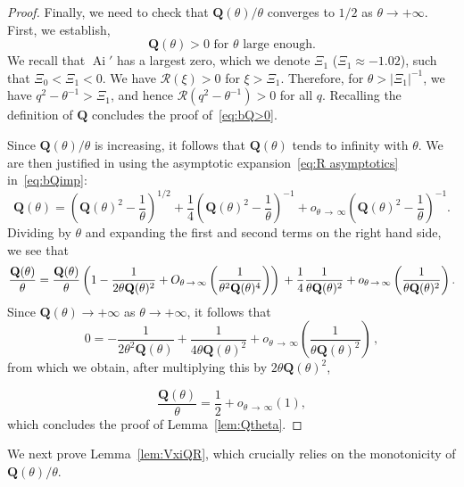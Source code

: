 \documentclass[10pt]{amsart}
\theoremstyle{definition}\newtheorem{defi}[theo]{Definition}\newtheorem{rema}[theo]{Remark}\newtheorem{exam}[theo]{Example}\newtheorem{exem}[theo]{Example}\newtheorem{nota}[theo]{Notation}
\DeclareMathOperator{\Ai}{Ai}
\newcommand{\bQ}{\mathbf{Q}}
\newcommand{\mR}{\mathcal{R}}
\newcommand{\1}{\mathds{1}}
\begin{document}
\begin{proof}
Finally, we need to check that $\bQ(\theta)/\theta$ converges to $1/2$ as $\theta\to +\infty$. First, we establish,
\begin{equation}\label{eq:bQ>0}
\bQ(\theta) > 0 \text{ for $\theta$ large enough.}
\end{equation}
We recall that $\Ai'$ has a largest zero, which we denote $\Xi_1$ ($\Xi_1\approx -1.02$), such that $\Xi_0< \Xi_1 <0$. We have $\mR(\xi)>0$ for $\xi>\Xi_1$. Therefore, for $\theta>|\Xi_1|^{-1}$, we have $q^2-\theta^{-1}> \Xi_1$, and hence $\mR(q^2-\theta^{-1})>0$ for all $q$. Recalling the definition of $\bQ$ concludes the proof of~\eqref{eq:bQ>0}.

Since $\bQ(\theta)/\theta$ is increasing, it follows that $\bQ(\theta)$ tends to infinity with $\theta$. We are then justified in using the asymptotic expansion~\eqref{eq:R asymptotics} in~\eqref{eq:bQimp}:
\[
\bQ(\theta) = \left(\bQ(\theta)^2 - \frac{1}{ \theta}\right)^{1/2} + \frac{1}{4}\left(\bQ(\theta)^2 - \frac{1}{ \theta}\right)^{-1} + o_{\theta\,\to\,\infty} \left(\bQ(\theta)^2 - \frac{1} {\theta}\right)^{-1}.
\]
Dividing by $\theta$ and expanding the first and second terms on the right hand side, we see that
\begin{equation*}
\frac{\bQ(\theta)}{\theta} = \frac{\bQ(\theta)}{\theta}\left(1 - \frac{1}{2\theta\bQ(\theta)^2} + O_{\theta\,\to\,\infty}\left(\frac{1}{\theta^2\bQ(\theta)^4}\right)\right)\\
+ \frac{1}{4}\frac{1}{\theta\bQ(\theta)^2} + o_{\theta\,\to\,\infty} \left(\frac{1}{\theta\bQ(\theta)^2}\right).
\end{equation*}
Since $\bQ(\theta)\to +\infty$ as $\theta\to +\infty$, it follows that
\[
0 = -\frac{1}{2\theta^2\bQ(\theta)} + \frac{1}{4\theta \bQ(\theta)^2} + o_{\theta\,\to\,\infty}\left(\frac{1}{\theta \bQ(\theta)^2}\right)\,,
\]
from which we obtain, after multiplying this by $2\theta \bQ(\theta)^2 $,

\[
\frac{\bQ(\theta)}{\theta} = \frac{1}{2} + o_{\theta\,\to\,\infty}(1),
\]
which concludes the proof of Lemma~\ref{lem:Qtheta}.
\end{proof}

We next prove Lemma~\ref{lem:VxiQR}, which crucially relies on the monotonicity of $\bQ(\theta)/\theta$.
\end{document}
